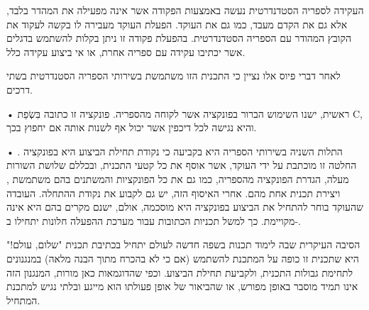 העקידה לספריה הסטדנדרטית נעשה באמצעות הפקודה  אשר אינה מפעילה את המהדר
בלבד, אלא גם את הקדם מעבד, כמו גם את העוקד. הפעלת העוקד מעבירה לו בקשה לעקוד את
הקובץ המהודר עם הספריה הסטדנדרטית. בהפעלת פקודה זו ניתן בקלות להשתמש בדגלים אשר
יכתיבו עקידה עם ספריה אחרת, או אי ביצוע עקידה כלל.

לאחר דברי פיוס אלו נציין כי התכנית הזו משתמשת בשירותי הספריה הסטנדרטית בשתי דרכים.
\begin{itemize}
• ראשית, ישנו השימוש הברור בפונקציה  אשר לקוחה מהספריה. פונקציה זו
כתובה בִּשְׂפַת C, והיא נגישה לכל דיכפין אשר יכול אף לשנות אותה אם יחפוץ בכך.

• התלות השניה בשירותי הספריה היא בקביעה כי נקודת תחילת הביצוע היא בפונקציה
. החלטה זו מוכתבת על ידי העוקד, אשר אוסף את כל קטעי התכנית, ובכללם
שלושת השורות מעלה, הגדרת הפונקציה  מהספריה, כמו גם את כל הפונקציות
והמשתנים בהם משתמשת , ויצירת תכנית אחת מהם. אחרי האיסוף הזה, יש גם
לקבוע את נקודת ההתחלה.  העובדה שהעוקד בוחר להתחיל את הביצוע בפונקציה 
היא מוסכמה, אולם, ישנם מקרים בהם היא אינה מקויימת. כך למשל תכניות הכתובות עבור
מערכת ההפעלה חלונות יתחילו ב-.

\end{itemize}

הסיבה העיקרית שבה לימוד תכנות בשפה חדשה לעולם יתחיל בכתיבת תכנית "שלום, עולם!"
היא שתכנית זו כופה על המתכנת להשתמש (אם כי לא בהכרח מתוך הבנה מלאה) במנגנונים
לתחימת גבולות התכנית, ולקביעת תחילת הביצוע. וכפי שהדוגמאות כאן מורות, המנגנון
הזה אינו תמיד מוסבר באופן מפורש, או שהביאור של אופן פעולתו הוא מייגע ובלתי נגיש
למתכנת המתחיל.

